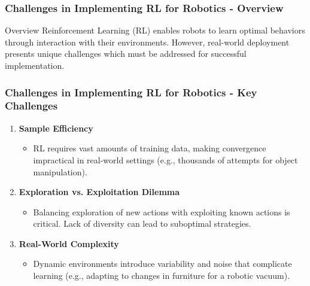 \documentclass{beamer}
\begin{document}
\begin{frame}[fragile]
    \frametitle{Challenges in Implementing RL for Robotics - Overview}
    \begin{block}{Overview}
        Reinforcement Learning (RL) enables robots to learn optimal behaviors through interaction with their environments. However, real-world deployment presents unique challenges which must be addressed for successful implementation.
    \end{block}
\end{frame}

\begin{frame}[fragile]
    \frametitle{Challenges in Implementing RL for Robotics - Key Challenges}
    \begin{enumerate}
        \item \textbf{Sample Efficiency}
        \begin{itemize}
            \item RL requires vast amounts of training data, making convergence impractical in real-world settings (e.g., thousands of attempts for object manipulation).
        \end{itemize}

        \item \textbf{Exploration vs. Exploitation Dilemma}
        \begin{itemize}
            \item Balancing exploration of new actions with exploiting known actions is critical. Lack of diversity can lead to suboptimal strategies.
        \end{itemize}

        \item \textbf{Real-World Complexity}
        \begin{itemize}
            \item Dynamic environments introduce variability and noise that complicate learning (e.g., adapting to changes in furniture for a robotic vacuum).
        \end{itemize}
    \end{enumerate}
\end{frame}
\end{document}
